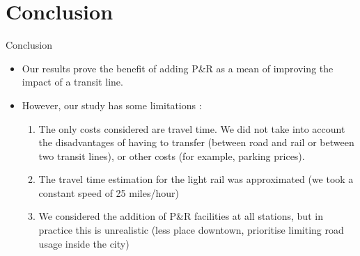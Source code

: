 \documentclass{EESD}
\begin{document}
\section{Conclusion}
\begin{frame}{Conclusion}
	\begin{itemize}
		\item Our results prove the benefit of adding P\&R as a mean of improving the impact of a transit line.
		\item However, our study has some limitations : \begin{enumerate}
			\item The only costs considered are travel time. We did not take into account the disadvantages of having to transfer (between road and rail or between two transit lines), or other costs (for example, parking prices).
			\item The travel time estimation for the light rail was approximated (we took a constant speed of 25 miles/hour)
			\item We considered the addition of P\&R facilities at all stations, but in practice this is unrealistic (less place downtown, prioritise limiting road usage inside the city)
		\end{enumerate}
	\end{itemize}
\end{frame}
\end{document}
